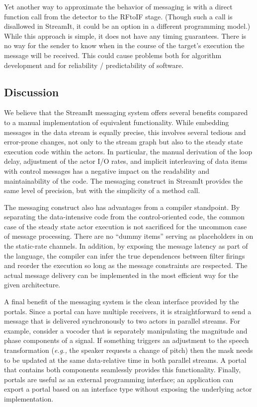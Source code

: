 Yet another way to approximate the behavior of messaging is with a
direct function call from the detector to the RFtoIF stage.  (Though
such a call is disallowed in StreamIt, it could be an option in a
different programming model.)  While this approach is simple, it does
not have any timing guarantees.  There is no way for the sender to
know when in the course of the target's execution the message will be
received.  This could cause problems both for algorithm development
and for reliability / predictability of software.

\vspace{12pt}
\subsection{Discussion}

We believe that the StreamIt messaging system offers several benefits
compared to a manual implementation of equivalent functionality.
While embedding messages in the data stream is equally precise, this
involves several tedious and error-prone changes, not only to the
stream graph but also to the steady state execution code within the
actors.  In particular, the manual derivation of the loop delay,
adjustment of the actor I/O rates, and implicit interleaving of data
items with control messages has a negative impact on the readability
and maintainability of the code.  The messaging construct in StreamIt
provides the same level of precision, but with the simplicity of a
method call.

The messaging construct also has advantages from a compiler
standpoint.  By separating the data-intensive code from the
control-oriented code, the common case of the steady state actor
execution is not sacrificed for the uncommon case of message
processing.  There are no ``dummy items'' serving as placeholders in
on the static-rate channels.  In addition, by exposing the message
latency as part of the language, the compiler can infer the true
dependences between filter firings and reorder the execution so long
as the message constraints are respected.  The actual message delivery
can be implemented in the most efficient way for the given
architecture.

A final benefit of the messaging system is the clean interface
provided by the portals.  Since a portal can have multiple receivers,
it is straightforward to send a message that is delivered
synchronously to two actors in parallel streams.  For example,
consider a vocoder that is separately manipulating the magnitude and
phase components of a signal.  If something triggers an adjustment to
the speech transformation ({\it e.g.,} the speaker requests a change
of pitch) then the mask needs to be updated at the same data-relative
time in both parallel streams.  A portal that contains both components
seamlessly provides this functionality.  Finally, portals are useful
as an external programming interface; an application can export a
portal based on an interface type without exposing the underlying
actor implementation.

